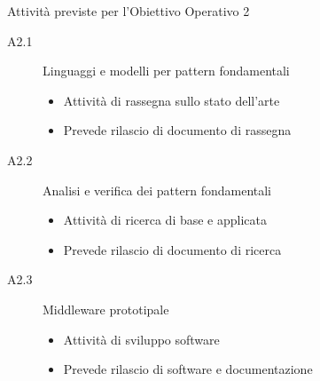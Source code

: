 \documentclass[10pt]{beamer}
\begin{document}
\begin{frame}
\begin{block}{Attivit\`{a} previste per l'Obiettivo Operativo 2} 
\begin{description}
\item[A2.1] Linguaggi e modelli per pattern fondamentali\\
\begin{itemize}
 \item Attivit\`{a} di rassegna sullo stato dell'arte
\item Prevede rilascio di documento di rassegna
\end{itemize}
\item[A2.2] Analisi e verifica dei pattern fondamentali
\begin{itemize}
 \item Attivit\`{a} di ricerca di base e applicata
\item Prevede rilascio di documento di ricerca 
\end{itemize}
\item[A2.3] Middleware prototipale
\begin{itemize}
 \item Attivit\`{a} di sviluppo software
\item Prevede rilascio di software e documentazione 
\end{itemize}
\end{description}
\end{block}
\end{frame}
\end{document}
